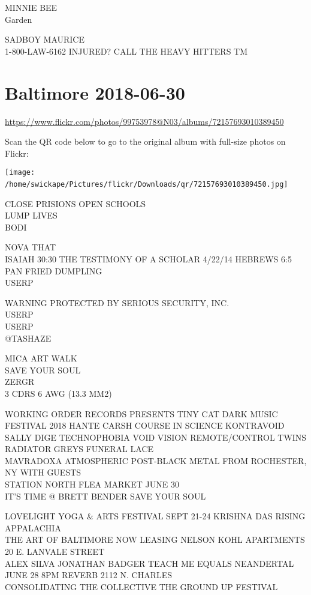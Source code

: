 \documentclass[10pt,letterpaper]{article}
\begin{document}
MINNIE BEE\\
Garden

SADBOY MAURICE\\
1{-}800{-}LAW{-}6162 INJURED?  CALL THE HEAVY HITTERS TM
\

\section*{Baltimore 2018-06-30}

\url{https://www.flickr.com/photos/99753978@N03/albums/72157693010389450}

Scan the QR code below to go to the original album with full-size photos on Flickr:

\texttt{[image: /home/swickape/Pictures/flickr/Downloads/qr/72157693010389450.jpg]}
\

CLOSE PRISIONS OPEN SCHOOLS\\
LUMP LIVES\\
BODI

NOVA THAT\\
ISAIAH 30:30 THE TESTIMONY OF A SCHOLAR 4/22/14 HEBREWS 6:5\\
PAN FRIED DUMPLING\\
USERP

WARNING PROTECTED BY SERIOUS SECURITY, INC.\\
USERP\\
USERP\\
@TASHAZE

MICA ART WALK\\
SAVE YOUR SOUL\\
ZERGR\\
3 CDRS 6 AWG (13.3 MM2)

WORKING ORDER RECORDS PRESENTS TINY CAT DARK MUSIC FESTIVAL 2018 HANTE CARSH COURSE IN SCIENCE KONTRAVOID SALLY DIGE TECHNOPHOBIA VOID VISION REMOTE/CONTROL TWINS RADIATOR GREYS FUNERAL LACE\\
MAVRADOXA ATMOSPHERIC POST{-}BLACK METAL FROM ROCHESTER, NY WITH GUESTS\\
STATION NORTH FLEA MARKET JUNE 30\\
IT'S TIME @ BRETT BENDER SAVE YOUR SOUL

LOVELIGHT YOGA \& ARTS FESTIVAL SEPT 21{-}24 KRISHNA DAS RISING APPALACHIA\\
THE ART OF BALTIMORE NOW LEASING NELSON KOHL APARTMENTS 20 E. LANVALE STREET\\
ALEX SILVA JONATHAN BADGER TEACH ME EQUALS NEANDERTAL JUNE 28 8PM REVERB 2112 N. CHARLES\\
CONSOLIDATING THE COLLECTIVE THE GROUND UP FESTIVAL
\end{document}
